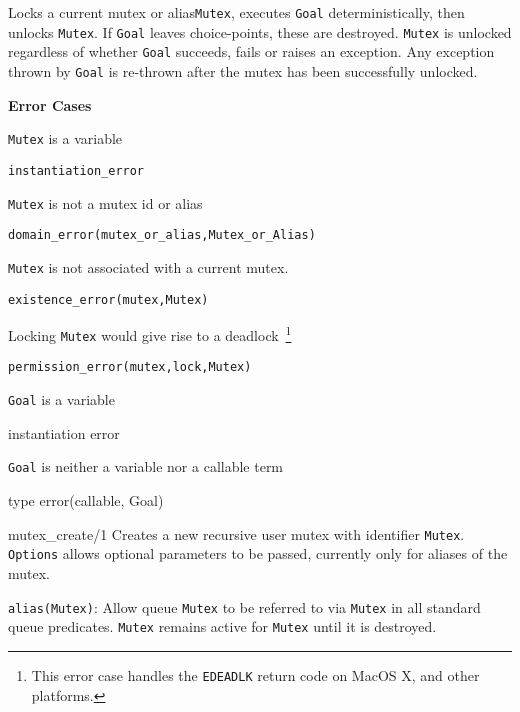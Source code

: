 \begin{description}
%
Locks a current mutex or alias{\tt Mutex}, executes {\tt Goal}
deterministically, then unlocks {\tt Mutex}.  If {\tt Goal} leaves
choice-points, these are destroyed.  {\tt Mutex} is unlocked
regardless of whether {\tt Goal} succeeds, fails or raises an
exception. Any exception thrown by {\tt Goal} is re-thrown after the
mutex has been successfully unlocked.

{\bf Error Cases}
\bi
\item 	{\tt Mutex} is a variable
\bi
\item 	{\tt instantiation\_error}
\ei
%
\item 	{\tt Mutex} is not a mutex id or alias
\bi
\item 	{\tt domain\_error(mutex\_or\_alias,Mutex\_or\_Alias)}
\ei
%
\item 	{\tt Mutex} is not associated with a current mutex.
\bi
\item 	{\tt existence\_error(mutex,Mutex)}
\ei
\item Locking {\tt Mutex} would give rise to a deadlock~\footnote{This
  error case handles the {\tt EDEADLK} return code on MacOS X, and other
  platforms.}
\bi
\item 	{\tt permission\_error(mutex,lock,Mutex)}
\ei
\item {\tt Goal} is a variable
\bi
\item  instantiation error
\ei
%
\item {\tt Goal} is neither a variable nor a callable term
\bi
\item type error(callable, Goal)
\ei
%
\ei

{mutex\_create/1}
%
Creates a new recursive user mutex with identifier {\tt Mutex}.  {\tt
  Options} allows optional parameters to be passed, currently only for
aliases of the mutex.
%
\bi
\item {\tt alias(Mutex)}: Allow queue {\tt Mutex} to be referred to
  via {\tt Mutex} in all standard queue predicates.  {\tt Mutex}
  remains active for {\tt Mutex} until it is destroyed.
\ei


\end{description}

